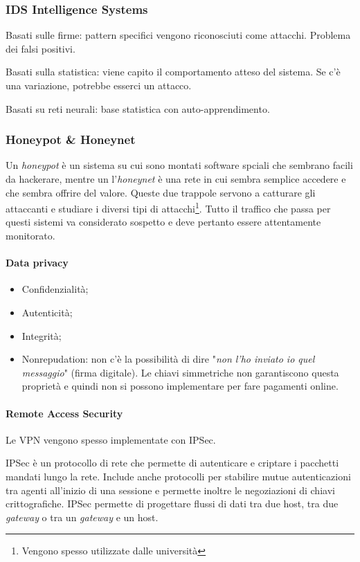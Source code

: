 \subsubsection{IDS Intelligence Systems}

Basati sulle firme: pattern specifici vengono riconosciuti come attacchi.
Problema dei falsi positivi.

Basati sulla statistica: viene capito il comportamento atteso del sistema. Se
c'è una variazione, potrebbe esserci un attacco.

Basati su reti neurali: base statistica con auto-apprendimento.

\subsubsection{Honeypot \& Honeynet}

Un \textit{honeypot} è un sistema su cui sono montati software spciali
che sembrano facili da hackerare,
mentre un l'\textit{honeynet} è una rete in cui sembra semplice accedere
e che sembra offrire del valore.   
Queste due trappole servono a catturare gli attaccanti e studiare 
i diversi tipi di attacchi\footnote{Vengono spesso utilizzate dalle
università}. Tutto il traffico che passa per questi sistemi va considerato
sospetto e deve pertanto essere attentamente monitorato.

\paragraph{Data privacy}

\begin{itemize}
\item Confidenzialità;
\item Autenticità;
\item Integrità;
\item Nonrepudation: non c'è la possibilità di dire "\textit{non l'ho inviato io
quel messaggio}" (firma digitale). Le chiavi simmetriche non garantiscono questa
proprietà e quindi non si possono implementare per fare pagamenti online.
\end{itemize}

\paragraph{Remote Access Security}

Le VPN vengono spesso implementate con IPSec.

IPSec è un protocollo di rete che permette di autenticare e criptare i
pacchetti mandati lungo la rete. Include anche protocolli per stabilire mutue
autenticazioni tra agenti all'inizio di una sessione e permette inoltre le
negoziazioni di chiavi crittografiche. IPSec permette di progettare flussi di
dati tra due host, tra due \textit{gateway} o tra un \textit{gateway} e un
host.

